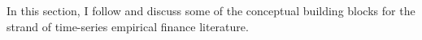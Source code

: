 In this section, I follow \citet[Chapter~5]{campbell2017financial} and discuss some 
of the conceptual building blocks for the strand of time-series empirical finance literature.
